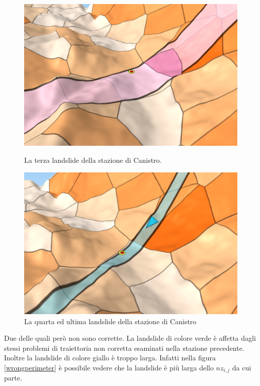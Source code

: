 \begin{figure}[h]
	\hspace{0.1\linewidth}
	\begin{minipage}[t]{0.35\linewidth}
		\centering
		\includegraphics[width=1\textwidth]{images/CanistroLandslide3}
		\caption{La terza landslide della stazione di Canistro.}
		\label{canistrolandslide3}
	\end{minipage}
	\hspace{0.1\linewidth}
	\begin{minipage}[t]{0.35\linewidth}
		\centering
		\includegraphics[width=1\textwidth]{images/CanistroLandslide4}
		\caption{La quarta ed ultima landslide della stazione di Canistro}
		\label{canistrolandslide4}
	\end{minipage}
\end{figure}


Due delle quali però non sono corrette. La landslide di colore verde è affetta dagli stessi problemi di traiettoria non corretta esaminati nella stazione precedente. Inoltre la landslide di colore giallo è troppo larga. Infatti nella figura \ref{wrongperimeter} è possibile vedere che la landslide è più larga dello $nz_{i,j}$ da cui parte.


